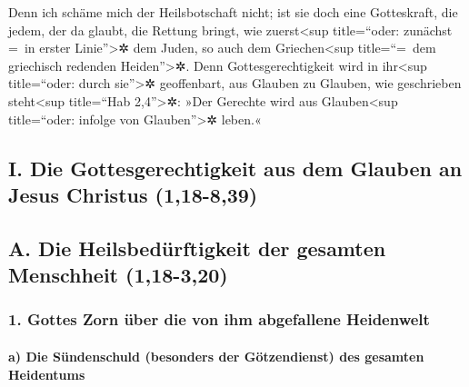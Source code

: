  Denn ich schäme mich der Heilsbotschaft nicht; ist sie
doch eine Gotteskraft, die jedem, der da glaubt, die Rettung bringt, wie
zuerst\textless sup title=``oder: zunächst =~in erster
Linie''\textgreater✲ dem Juden, so auch dem Griechen\textless sup
title=``=~dem griechisch redenden Heiden''\textgreater✲. 
Denn Gottesgerechtigkeit wird in ihr\textless sup title=``oder: durch
sie''\textgreater✲ geoffenbart, aus Glauben zu Glauben, wie geschrieben
steht\textless sup title=``Hab 2,4''\textgreater✲: »Der Gerechte wird
aus Glauben\textless sup title=``oder: infolge von
Glauben''\textgreater✲ leben.«

\hypertarget{i.-die-gottesgerechtigkeit-aus-dem-glauben-an-jesus-christus-118-839}{%
\subsection{I. Die Gottesgerechtigkeit aus dem Glauben an Jesus Christus
(1,18-8,39)}\label{i.-die-gottesgerechtigkeit-aus-dem-glauben-an-jesus-christus-118-839}}

\hypertarget{a.-die-heilsbeduxfcrftigkeit-der-gesamten-menschheit-118-320}{%
\subsection{A. Die Heilsbedürftigkeit der gesamten Menschheit
(1,18-3,20)}\label{a.-die-heilsbeduxfcrftigkeit-der-gesamten-menschheit-118-320}}

\hypertarget{gottes-zorn-uxfcber-die-von-ihm-abgefallene-heidenwelt}{%
\subsubsection{1. Gottes Zorn über die von ihm abgefallene
Heidenwelt}\label{gottes-zorn-uxfcber-die-von-ihm-abgefallene-heidenwelt}}

\hypertarget{a-die-suxfcndenschuld-besonders-der-guxf6tzendienst-des-gesamten-heidentums}{%
\paragraph{a) Die Sündenschuld (besonders der Götzendienst) des gesamten
Heidentums}\label{a-die-suxfcndenschuld-besonders-der-guxf6tzendienst-des-gesamten-heidentums}}

